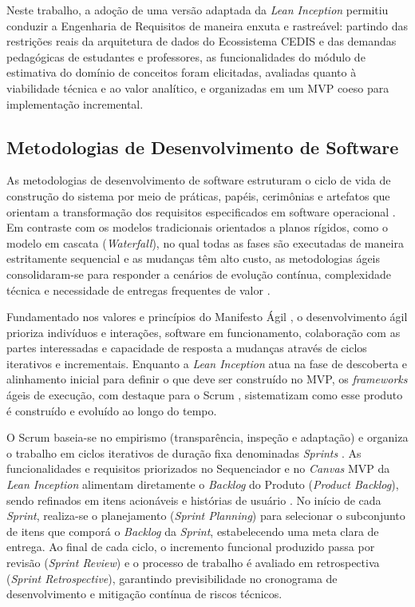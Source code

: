 Neste trabalho, a adoção de uma versão adaptada da \textit{Lean Inception} permitiu conduzir a Engenharia de Requisitos de maneira enxuta e rastreável: partindo das restrições reais da arquitetura de dados do Ecossistema CEDIS e das demandas pedagógicas de estudantes e professores, as funcionalidades do módulo de estimativa do domínio de conceitos foram elicitadas, avaliadas quanto à viabilidade técnica e ao valor analítico, e organizadas em um MVP coeso para implementação incremental.

\subsection{Metodologias de Desenvolvimento de Software}
\label{subsec:metodologias-desenvolvimento}

As metodologias de desenvolvimento de software estruturam o ciclo de vida de construção do sistema por meio de práticas, papéis, cerimônias e artefatos que orientam a transformação dos requisitos especificados em software operacional \cite{pressman_engenharia_2021}. Em contraste com os modelos tradicionais orientados a planos rígidos, como o modelo em cascata (\textit{Waterfall}), no qual todas as fases são executadas de maneira estritamente sequencial e as mudanças têm alto custo, as metodologias ágeis consolidaram-se para responder a cenários de evolução contínua, complexidade técnica e necessidade de entregas frequentes de valor \cite{sommerville_engenharia_2019}.

Fundamentado nos valores e princípios do Manifesto Ágil \cite{beck_manifesto_2001}, o desenvolvimento ágil prioriza indivíduos e interações, software em funcionamento, colaboração com as partes interessadas e capacidade de resposta a mudanças através de ciclos iterativos e incrementais. Enquanto a \textit{Lean Inception} atua na fase de descoberta e alinhamento inicial para definir o que deve ser construído no MVP, os \textit{frameworks} ágeis de execução, com destaque para o Scrum \cite{schwaber_scrum_2020}, sistematizam como esse produto é construído e evoluído ao longo do tempo.

O Scrum baseia-se no empirismo (transparência, inspeção e adaptação) e organiza o trabalho em ciclos iterativos de duração fixa denominadas \textit{Sprints} \cite{schwaber_scrum_2020}. As funcionalidades e requisitos priorizados no Sequenciador e no \textit{Canvas} MVP da \textit{Lean Inception} alimentam diretamente o \textit{Backlog} do Produto (\textit{Product Backlog}), sendo refinados em itens acionáveis e histórias de usuário \cite{cohn_user_2004, caroli_lean_2018}. No início de cada \textit{Sprint}, realiza-se o planejamento (\textit{Sprint Planning}) para selecionar o subconjunto de itens que comporá o \textit{Backlog} da \textit{Sprint}, estabelecendo uma meta clara de entrega. Ao final de cada ciclo, o incremento funcional produzido passa por revisão (\textit{Sprint Review}) e o processo de trabalho é avaliado em retrospectiva (\textit{Sprint Retrospective}), garantindo previsibilidade no cronograma de desenvolvimento e mitigação contínua de riscos técnicos.

